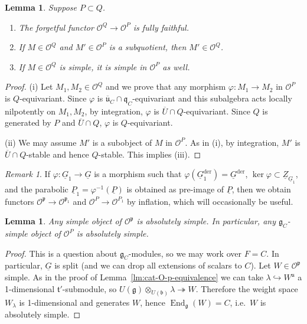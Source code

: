 \documentclass[a4paper]{amsart}
\numberwithin{equation}{section}
\newtheorem{lem}[thm]{Lemma}
\theoremstyle{remark}
\newtheorem{remark}[thm]{Remark}
\theoremstyle{definition}
\DeclareMathOperator{\End}{End}
\newcommand{\alggrp}[1]{\underline{#1}}
\newcommand{\der}{\mathrm{der}}
\newcommand{\into}{\hookrightarrow}
\newcommand{\onto}{\twoheadrightarrow}
\begin{document}
\begin{lem}\label{lem:cop}
  Suppose $P \subset Q$.
  \begin{enumerate}
  \item The forgetful functor $\mathcal{O}^{Q}\to \mathcal{O}^{P}$ is fully faithful.
  \item If $M \in \mathcal{O}^{Q}$ and $M' \in \mathcal{O}^{P}$ is a subquotient, then $M' \in \mathcal{O}^{Q}$.
  \item If $M \in \mathcal{O}^{Q}$ is simple, it is simple in $\mathcal{O}^{P}$ as well.
  \end{enumerate}
\end{lem}

\begin{proof}
(i)
Let $M_{1},M_{2}\in \mathcal{O}^{Q}$ and we prove that any morphism $\varphi\colon M_{1}\to M_{2}$ in $\mathcal{O}^{P}$ is $Q$-equivariant.
Since $\varphi$ is $\overline{\mathfrak{u}}_{C}\cap \mathfrak{q}_{C}$-equivariant and this subalgebra acts locally nilpotently on $M_{1},M_{2}$, by integration, $\varphi$ is $\overline{U}\cap Q$-equivariant.
Since $Q$ is generated by $P$ and $\overline{U}\cap Q$, $\varphi$ is $Q$-equivariant.

(ii)
We may assume $M'$ is a subobject of $M$ in $\mathcal{O}^{P}$.
As in (i), by integration, $M'$ is $\overline{U}\cap Q$-stable and hence $Q$-stable.
This implies (iii).
\end{proof}

\begin{remark}\label{rk:cat-O-isogeny}
  If $\varphi\colon \alggrp G_{1}\to \alggrp G$ is a morphism such that $\varphi(\alggrp{G}_{1}^{\der}) = \alggrp{G}^{\der}$, $\ker\varphi\subset \alggrp{Z}_{\alggrp G_{1}}$, and the parabolic $\alggrp P_1 = \varphi^{-1}(\alggrp P)$ is obtained as pre-image of $\alggrp P$, then we obtain functors $\mathcal O^{\mathfrak p} \to \mathcal O^{\mathfrak p_1}$ and $\mathcal O^P \to \mathcal O^{P_1}$ by inflation, which will occasionally be useful.
\end{remark}

\begin{lem}\label{lem:abs-simple-g-module}
  Any simple object of $\mathcal{O}^{\mathfrak{p}}$ is absolutely simple.
  In particular, any $\mathfrak{g}_{C}$-simple object of $\mathcal{O}^{P}$ is absolutely simple.
\end{lem}

\begin{proof}
  This is a question about $\mathfrak{g}_{C}$-modules, so we may work over $F = C$.
  In particular, $\alggrp G$ is split (and we can drop all extensions of scalars to $C$). 
  Let $W \in \mathcal{O}^{\mathfrak{p}}$ simple.
  As in the proof of Lemma~\ref{lm:cat-O-p-equivalence} we can take $\lambda \into W^{\mathfrak u}$ a 1-dimensional $\mathfrak t'$-submodule, 
  so $U(\mathfrak{g}) \otimes_{U(\mathfrak b)} \lambda \onto W$. Therefore the weight space $W_\lambda$ is 1-dimensional
  and generates $W$, hence $\End_{\mathfrak{g}}(W) = C$, i.e.\ $W$ is absolutely simple.
\end{proof}
\end{document}
